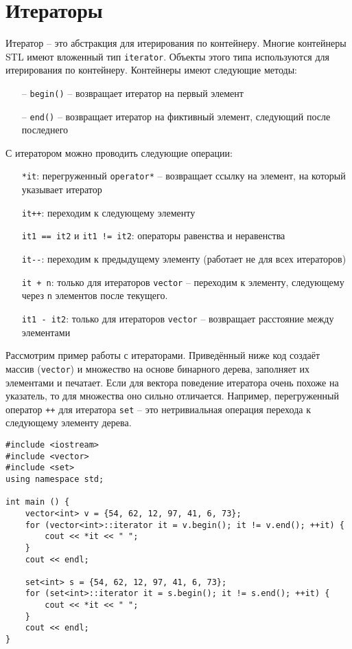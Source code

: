 \documentclass{article}
\begin{document}
\section*{Итераторы}
Итератор -- это абстракция для итерирования по контейнеру. Многие контейнеры STL имеют вложенный тип \texttt{iterator}. Объекты этого типа используются для итерирования по контейнеру. Контейнеры имеют следующие методы:
\begin{itemize}
\item[--] \texttt{begin()} -- возвращает итератор на первый элемент
\item[--] \texttt{end()}  -- возвращает итератор на фиктивный элемент, следующий после последнего
\end{itemize}
С итератором можно проводить следующие операции:
\begin{itemize}
\item[] \texttt{*it}: перегруженный \texttt{operator*} -- возвращает ссылку на элемент, на который указывает итератор
\item[] \texttt{it++}: переходим к следующему элементу
\item[] \texttt{it1 == it2} и \texttt{it1 != it2}:  операторы равенства и неравенства
\item[] \texttt{it-{}-}: переходим к предыдущему элементу (работает не для всех итераторов)
\item[] \texttt{it + n}: только для итераторов \texttt{vector} -- переходим к элементу, следующему через \texttt{n} элементов после текущего.
\item[] \texttt{it1 - it2}: только для итераторов \texttt{vector} -- возвращает расстояние между элементами
\end{itemize}

Рассмотрим пример работы с итераторами. Приведённый ниже код создаёт массив (\texttt{vector}) и множество на основе бинарного дерева, заполняет их элементами и печатает. Если для вектора поведение итератора очень похоже на указатель, то для множества оно сильно отличается. Например, перегруженный оператор \texttt{++} для итератора \texttt{set} -- это нетривиальная операция перехода к следующему элементу дерева.
\begin{lstlisting}
#include <iostream>
#include <vector>
#include <set>
using namespace std;

int main () {
    vector<int> v = {54, 62, 12, 97, 41, 6, 73};
    for (vector<int>::iterator it = v.begin(); it != v.end(); ++it) {
        cout << *it << " ";
    }
    cout << endl;
    
    set<int> s = {54, 62, 12, 97, 41, 6, 73};
    for (set<int>::iterator it = s.begin(); it != s.end(); ++it) {
        cout << *it << " ";
    }
    cout << endl;
}
\end{lstlisting}
\end{document}
